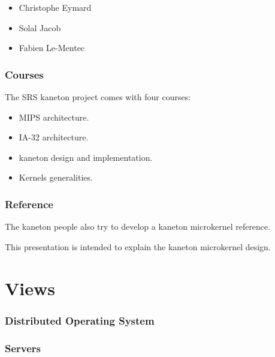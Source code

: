 {\begin{frame}
  \begin{itemize}
    \item
      Christophe Eymard
    \item
      Solal Jacob
    \item
      Fabien Le-Mentec
  \end{itemize}
\end{frame}


\begin{frame}
  \frametitle{Courses}

  The SRS kaneton project comes with four courses:

  \begin{itemize}[<+->]
    \item
      MIPS architecture.
    \item
      IA-32 architecture.
    \item
      kaneton design and implementation.
    \item
      Kernels generalities.
  \end{itemize}
\end{frame}


\begin{frame}
  \frametitle{Reference}

  The kaneton people also try to develop a kaneton microkernel reference.

  \nl

  This presentation is intended to explain the kaneton microkernel
  design.
\end{frame}

%
%

\section{Views}


\begin{frame}
  \frametitle{Distributed Operating System}

  \begin{center}
  \end{center}
\end{frame}


\begin{frame}
  \frametitle{Servers}

  \begin{center}
  \end{center}
\end{frame}

}
